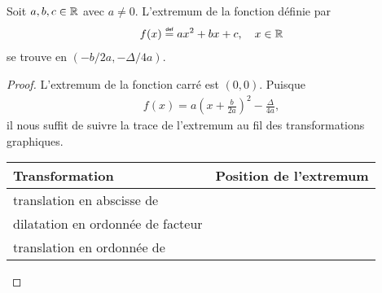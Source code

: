 \documentclass[main.tex]{subfiles}
\begin{document}
\begin{corollary}
    Soit $a, b, c \in \mathbb{R}$ avec $a \neq 0$.
    L'extremum de la fonction définie par
    \begin{align}
        f(x) \defeq ax^2 + bx + c,
        \quad x \in \R
    \end{align}
    se trouve en $(-b/2a, -\Delta/4a)$.
\end{corollary}
\begin{proof}
    L'extremum de la fonction carré est $(0, 0)$.
    Puisque
    \begin{align}
        f(x) = a\left(x + \frac b {2a}\right)^2 - \frac \Delta {4a},
    \end{align}
    il nous suffit de suivre la trace de l'extremum au fil des transformations graphiques.

    \begin{center}
        \begin{tabular}{l{10cm} l{10cm}}
            \toprule
            Transformation & Position de l'extremum\\
            \midrule
            translation en abscisse de \hspace{3cm} & \\
            dilatation en ordonnée de facteur \hspace {1cm} & \\
            translation en ordonnée de \hspace{3cm} & \\
            \bottomrule
        \end{tabular}
    \end{center}
\end{proof}
\end{document}
